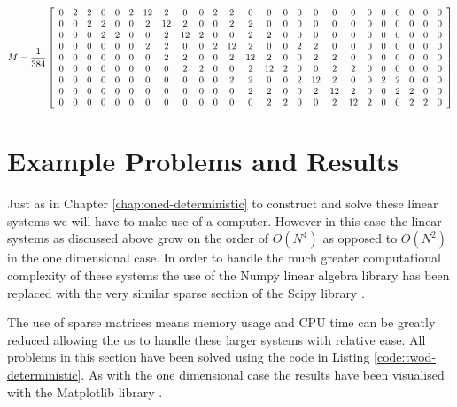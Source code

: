 \begin{equation}
    M = \frac{1}{384}
        \left[\begin{array}{c c c c c c c c c c c c c c c c c c c c c c c c c}
    0 & 2 & 2 & 0 & 0 & 2 & 12 & 2 & 0 & 0 & 2 & 2 & 0 & 0 & 0 & 0 & 0 & 0 & 0 & 0 & 0 & 0 & 0 & 0 & 0 \\
    0 & 0 & 2 & 2 & 0 & 0 & 2 & 12 & 2 & 0 & 0 & 2 & 2 & 0 & 0 & 0 & 0 & 0 & 0 & 0 & 0 & 0 & 0 & 0 & 0 \\
    0 & 0 & 0 & 2 & 2 & 0 & 0 & 2 & 12 & 2 & 0 & 0 & 2 & 2 & 0 & 0 & 0 & 0 & 0 & 0 & 0 & 0 & 0 & 0 & 0 \\
    0 & 0 & 0 & 0 & 0 & 0 & 2 & 2 & 0 & 0 & 2 & 12 & 2 & 0 & 0 & 2 & 2 & 0 & 0 & 0 & 0 & 0 & 0 & 0 & 0 \\
    0 & 0 & 0 & 0 & 0 & 0 & 0 & 2 & 2 & 0 & 0 & 2 & 12 & 2 & 0 & 0 & 2 & 2 & 0 & 0 & 0 & 0 & 0 & 0 & 0 \\
    0 & 0 & 0 & 0 & 0 & 0 & 0 & 0 & 2 & 2 & 0 & 0 & 2 & 12 & 2 & 0 & 0 & 2 & 2 & 0 & 0 & 0 & 0 & 0 & 0 \\
    0 & 0 & 0 & 0 & 0 & 0 & 0 & 0 & 0 & 0 & 0 & 2 & 2 & 0 & 0 & 2 & 12 & 2 & 0 & 0 & 2 & 2 & 0 & 0 & 0 \\
    0 & 0 & 0 & 0 & 0 & 0 & 0 & 0 & 0 & 0 & 0 & 0 & 2 & 2 & 0 & 0 & 2 & 12 & 2 & 0 & 0 & 2 & 2 & 0 & 0 \\
    0 & 0 & 0 & 0 & 0 & 0 & 0 & 0 & 0 & 0 & 0 & 0 & 0 & 2 & 2 & 0 & 0 & 2 & 12 & 2 & 0 & 0 & 2 & 2 & 0
    \end{array}\right]
\end{equation}

\section{Example Problems and Results}

Just as in Chapter \ref{chap:oned-deterministic} to construct and solve these
linear systems we will have to make use of a computer. However in this case the
linear systems as discussed above  grow
on the order of $O(N^4)$ as opposed to $O(N^2)$ in the one dimensional case. In
order to handle the much greater computational complexity of these systems the
use of the Numpy linear algebra library has been replaced with the very similar
sparse section of the Scipy library \cite{scipy}.

The use of sparse matrices means memory usage and CPU time can be greatly
reduced allowing the us to handle these larger systems with relative ease. All
problems in this section have been solved using the code in Listing
\ref{code:twod-deterministic}. As with the one dimensional case the results
have been visualised with the Matplotlib library \cite{matplotlib}.

